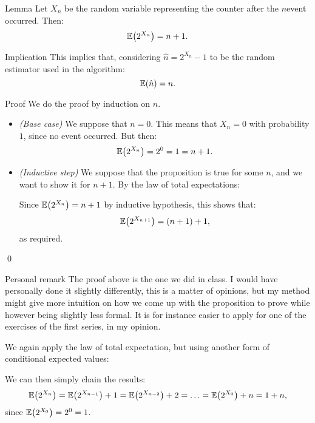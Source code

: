 \documentclass[a4paper]{article}
\begin{document}
\begin{parag}{Lemma}
    Let $X_n$ be the random variable representing the counter after the $n$\Th event occurred. Then:
    \[\exval\left(2^{X_n}\right) = n+1.\]

    \begin{subparag}{Implication}
        This implies that, considering $\hat{n} = 2^{X_n} - 1$ to be the random estimator used in the algorithm: 
        \[\exval\left(\hat{n}\right) = n.\]
    \end{subparag}

    \begin{subparag}{Proof}
        We do the proof by induction on $n$.
        \begin{itemize}[left=0pt]
            \item \textit{(Base case)} We suppose that $n = 0$. This means that $X_n = 0$ with probability $1$, since no event occurred. But then: 
            \[\exval\left(2^{X_n}\right) = 2^0 = 1 = n + 1.\]
            \item \textit{(Inductive step)} We suppose that the proposition is true for some $n$, and we want to show it for $n + 1$. By the law of total expectations: 

            Since $\exval\left(2^{X_n}\right) = n + 1$ by inductive hypothesis, this shows that: 
            \[\exval\left(2^{X_{n+1}}\right) = \left(n+1\right) + 1,\]
            as required.
        \end{itemize}
        
        \qed
    \end{subparag}

    \begin{subparag}{Personal remark}
        The proof above is the one we did in class. I would have personally done it slightly differently, this is a matter of opinions, but my method might give more intuition on how we come up with the proposition to prove while however being slightly less formal. It is for instance easier to apply for one of the exercises of the first series, in my opinion.

        We again apply the law of total expectation, but using another form of conditional expected values: 
        
        We can then simply chain the results: 
        \[\exval\left(2^{X_n}\right) = \exval\left(2^{X_{n-1}}\right) + 1 = \exval\left(2^{X_{n-2}}\right) + 2 = \ldots = \exval\left(2^{X_0}\right) + n = 1 + n,\]
        since $\exval\left(2^{X_0}\right) = 2^0 = 1$.
    \end{subparag}
\end{parag}
\end{document}
